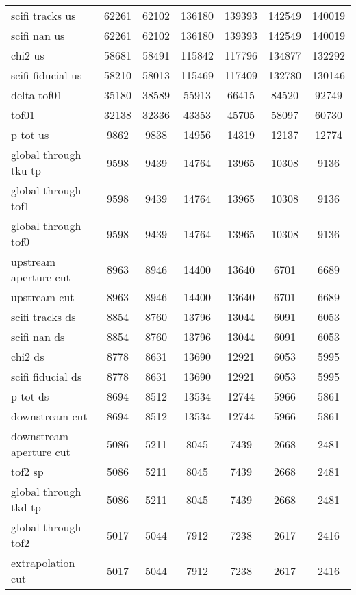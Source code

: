 \begin{landscape}
\begin{table}
\begin{tabular}[pos]{l|cccccc}
scifi tracks us       &  62261  &  62102  &  136180  &  139393  &  142549  &  140019  \\
scifi nan us          &  62261  &  62102  &  136180  &  139393  &  142549  &  140019  \\
chi2 us               &  58681  &  58491  &  115842  &  117796  &  134877  &  132292  \\
scifi fiducial us     &  58210  &  58013  &  115469  &  117409  &  132780  &  130146  \\
\hline
delta tof01           &  35180  &  38589  &  55913  &  66415  &  84520  &  92749  \\
tof01                 &  32138  &  32336  &  43353  &  45705  &  58097  &  60730  \\
p tot us              &  9862  &  9838  &  14956  &  14319  &  12137  &  12774  \\
\hline
global through tku tp  &  9598  &  9439  &  14764  &  13965  &  10308  &  9136  \\
global through tof1   &  9598  &  9439  &  14764  &  13965  &  10308  &  9136  \\
global through tof0   &  9598  &  9439  &  14764  &  13965  &  10308  &  9136  \\
upstream aperture cut  &  8963  &  8946  &  14400  &  13640  &  6701  &  6689  \\
\hline
upstream cut          &  8963  &  8946  &  14400  &  13640  &  6701  &  6689  \\
\hline
scifi tracks ds       &  8854  &  8760  &  13796  &  13044  &  6091  &  6053  \\
scifi nan ds          &  8854  &  8760  &  13796  &  13044  &  6091  &  6053  \\
chi2 ds               &  8778  &  8631  &  13690  &  12921  &  6053  &  5995  \\
scifi fiducial ds     &  8778  &  8631  &  13690  &  12921  &  6053  &  5995  \\
p tot ds              &  8694  &  8512  &  13534  &  12744  &  5966  &  5861  \\
\hline
downstream cut        &  8694  &  8512  &  13534  &  12744  &  5966  &  5861  \\
\hline
downstream aperture cut  &  5086  &  5211  &  8045  &  7439  &  2668  &  2481  \\
tof2 sp               &  5086  &  5211  &  8045  &  7439  &  2668  &  2481  \\
global through tkd tp  &  5086  &  5211  &  8045  &  7439  &  2668  &  2481  \\
global through tof2   &  5017  &  5044  &  7912  &  7238  &  2617  &  2416  \\
\hline
extrapolation cut     &  5017  &  5044  &  7912  &  7238  &  2617  &  2416  \\
\hline

\end{tabular}
\end{table}
\end{landscape}


